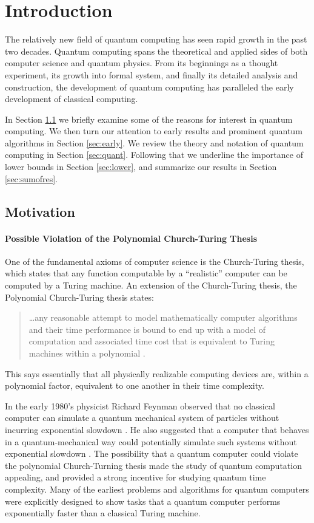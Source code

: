 \chapter{Introduction}
\label{ch:introduction}

The relatively new field of quantum computing has seen rapid growth in
the past two decades.  Quantum computing spans the theoretical and
applied sides of both computer science and quantum physics.  From its
beginnings as a thought experiment, its growth into formal system, and
finally its detailed analysis and construction, the development of
quantum computing has paralleled the early development of classical
computing.

In Section \ref{sec:mot} we briefly examine some of the reasons for
interest in quantum computing.  We then turn our attention to early
results and prominent quantum algorithms in Section \ref{sec:early}.
We review the theory and notation of quantum computing in Section
\ref{sec:quant}.  Following that we underline the importance of lower
bounds in Section \ref{sec:lower}, and summarize our results in
Section \ref{sec:sumofres}.

\section{Motivation}
\label{sec:mot}

\subsubsection{Possible Violation of the Polynomial Church-Turing Thesis}

One of the fundamental axioms of computer science is the Church-Turing
thesis, which states that any function computable by a ``realistic''
computer can be computed by a Turing machine.  An extension of the
Church-Turing thesis, the Polynomial Church-Turing thesis states:
\begin{quote}
\ldots any reasonable attempt to model mathematically
computer algorithms and their time performance is bound to end up with
a model of computation and associated time cost that is equivalent to
Turing machines within a polynomial \cite{papa94complexity}.
\end{quote} 
This says essentially that all physically realizable computing devices
are, within a polynomial factor, equivalent to one another in their
time complexity.

In the early 1980's physicist Richard Feynman observed that no
classical computer can simulate a quantum mechanical system of
particles without incurring exponential slowdown
\cite{williams98quantum}.  He also suggested that a computer that
behaves in a quantum-mechanical way could potentially simulate such
systems without exponential slowdown \cite{williams98quantum}.  The
possibility that a quantum computer could violate the polynomial
Church-Turning thesis made the study of quantum computation appealing,
and provided a strong incentive for studying quantum time complexity.
Many of the earliest problems and algorithms for quantum computers
were explicitly designed to show tasks that a quantum computer
performs exponentially faster than a classical Turing machine.
	
